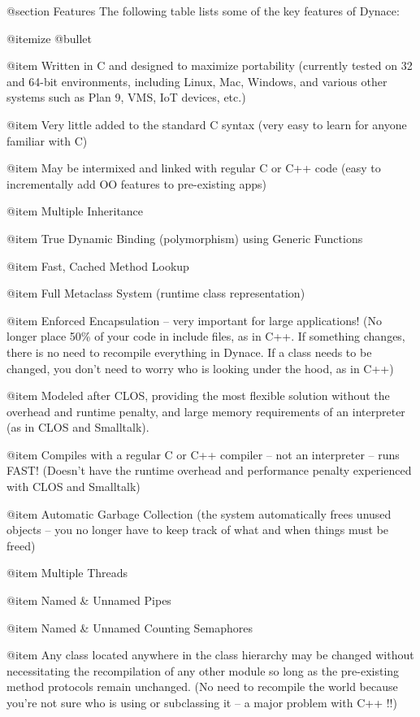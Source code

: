 @section Features
The following table lists some of the key features of Dynace:

@itemize @bullet

@item Written in C and designed to maximize portability (currently tested
on 32 and 64-bit environments, including Linux, Mac, Windows, and
various other systems such as Plan 9, VMS, IoT devices, etc.)

@item Very little added to the standard C syntax (very easy to learn for
anyone familiar with C)

@item May be intermixed and linked with regular C or C++ code (easy to
incrementally add OO features to pre-existing apps)

@item Multiple Inheritance

@item True Dynamic Binding (polymorphism) using Generic Functions

@item Fast, Cached Method Lookup

@item Full Metaclass System (runtime class representation)

@item Enforced Encapsulation -- very important for large 
applications!  (No longer place 50\% of your code in include files, as
in C++. If something changes, there is no need to recompile everything in
Dynace.  If a class needs to be changed, you don't need to worry who is
looking under the hood, as in C++)

@item Modeled after CLOS, providing the most flexible
solution without the overhead and runtime penalty, and large memory
requirements of an interpreter (as in CLOS and Smalltalk).

@item Compiles with a regular C or C++ compiler -- not an interpreter -- 
runs FAST!  (Doesn't have the runtime overhead and performance penalty
experienced with CLOS and Smalltalk)

@item Automatic Garbage Collection (the system automatically frees unused
objects -- you no longer have to keep track of what and when things
must be freed)

@item Multiple Threads

@item Named & Unnamed Pipes

@item Named & Unnamed Counting Semaphores

@item Any class located anywhere in the class hierarchy may be changed without
necessitating the recompilation of any other module so long as the
pre-existing method protocols remain unchanged. (No need to recompile
the world because you're not sure who is using or subclassing it -- a
major problem with C++ !!)

